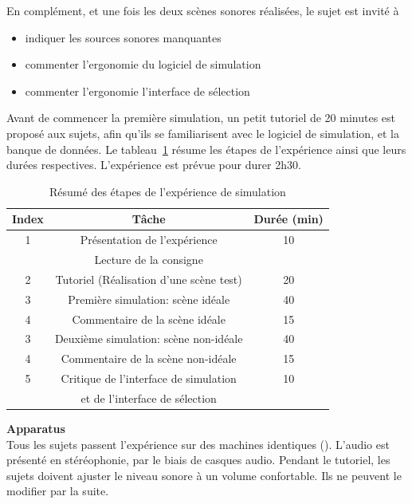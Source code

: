 En complément, et une fois les deux scènes sonores réalisées, le sujet est invité à 

\begin{itemize}
\item indiquer les sources sonores manquantes
\item commenter l’ergonomie du logiciel de simulation
\item commenter l’ergonomie  l'interface de sélection
\end{itemize}

Avant de commencer la première simulation, un petit tutoriel de 20 minutes est proposé aux sujets, afin qu'ils se familiarisent avec le logiciel de simulation, et la banque de données. Le tableau~\ref{tab:indSimu} résume les étapes de l’expérience ainsi que leurs durées respectives. L'expérience est prévue pour durer 2h30. \\

\begin{table}[t]
\centering
\begin{tabular}{c c c} 
Index          & Tâche                               & Durée (min) \\                      
\hline
1 & Présentation de l'expérience                     & 10 \\
  & Lecture de la consigne                           &  \\
\hline
2 & Tutoriel (Réalisation d'une scène test)          & 20 \\
\hline
3 & Première simulation: scène idéale                & 40 \\
\hline
4  & Commentaire de la scène idéale                  & 15 \\
\hline
3 & Deuxième simulation: scène non-idéale            & 40  \\
\hline
4  & Commentaire de la scène non-idéale              & 15 \\
\hline
5 & Critique de l'interface de simulation            & 10 \\
  & et de l'interface de sélection                   & \\
\hline
\end{tabular}
\vspace{0.5mm}
\caption{Résumé des étapes de l’expérience de simulation}
\label{tab:indSimu}
\end{table}

\textbf{Apparatus} \\

Tous les sujets passent l'expérience sur des machines identiques (). L'audio est présenté en stéréophonie, par le biais de casques audio. Pendant le tutoriel, les sujets doivent ajuster le niveau sonore à un volume confortable. Ils ne peuvent le modifier par la suite.

